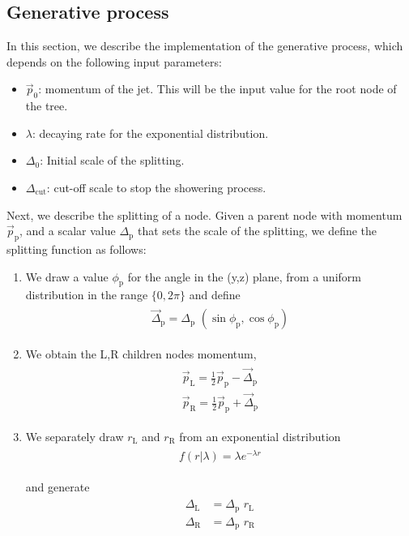\documentclass[12pt]{article}
\newcommand{\bea}{\begin{eqnarray}\begin{aligned}}
\newcommand{\eea}{\end{aligned}\end{eqnarray}}
\begin{document}
\subsection{Generative process}

In this section, we describe the implementation of the generative process, which depends on the following input parameters:
\begin{itemize}

\item $\vec{p}_0$: momentum of the jet. This will be the input value for the root node of the tree.
\item $\lambda$: decaying rate for the exponential distribution.
\item $\Delta_0$: Initial scale of the splitting. 
\item $\Delta_\text{cut}$: cut-off scale to stop the showering process. 

\end{itemize}

Next, we describe the splitting of a node.
Given a parent node with momentum $\vec{p}_\text{p}$, and a scalar value $\Delta_{\text{p}}$ that sets the scale of the splitting, we define the splitting function as follows:
\begin{enumerate}

\item We draw a value $\phi_\text{p}$ for the angle in the (y,z) plane, from a uniform distribution in the range $\{0,2\pi\}$ and define
\bea\label{eq:Deltavec}
\vec{\Delta}_\text{p}= \Delta_\text{p}\,\,(\sin\phi_\text{p},\cos\phi_\text{p})
\eea 

\item We obtain the L,R children nodes momentum,
\bea\label{eq:pLR}
\vec{p}_\text{L}= \frac{1}{2} \vec{p}_\text{p} - \vec{\Delta}_\text{p}  \\
\vec{p}_\text{R}= \frac{1}{2} \vec{p}_\text{p} +\vec{\Delta}_\text{p}
\eea

\item We separately draw $r_\text{L}$ and $r_\text{R}$ from an exponential distribution 
\bea \label{eq:exponential}
f(r | \lambda)=\lambda e^{-\lambda r} 
\eea

and generate
\bea
\Delta_\text{L} &= \Delta_\text{p} \,\, r_\text{L}\\
\Delta_\text{R} &= \Delta_\text{p} \,\, r_\text{R}
\eea

\end{enumerate}
\end{document}
